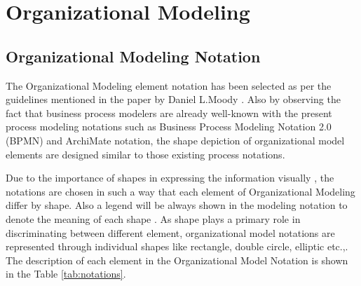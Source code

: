 \chapter{Organizational Modeling}
\label{chap:orgModeling}

\section{Organizational Modeling Notation}
\hspace{4ex} The Organizational Modeling element notation has been selected as per the guidelines mentioned in the paper by Daniel L.Moody \cite{Moody2009}. Also by observing  the fact that business process modelers are already well-known with the present process modeling notations such as Business Process Modeling Notation 2.0 (BPMN) \cite{bpm2011} and ArchiMate notation\cite{arc2013}, the shape depiction of organizational model elements are designed similar to those existing process notations. 

\hspace{4ex} Due to the importance of shapes in expressing the information visually , the notations are chosen in such a way that each element of Organizational Modeling  differ by shape. Also a legend will be always shown in the modeling notation to denote the meaning of each shape \cite{Moody2009}. As shape plays a primary role in discriminating between different element, organizational model notations are represented through individual shapes like rectangle, double circle, elliptic etc.,. The description of each element in the Organizational Model Notation is shown in the Table \ref{tab:notations}. 

